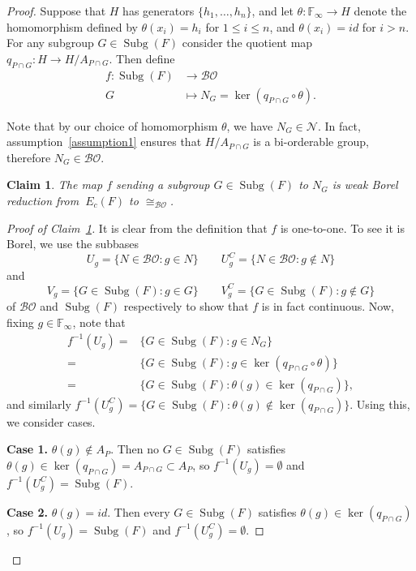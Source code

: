 \documentclass{amsart}
\newtheorem{claim}{Claim}[theorem]
\theoremstyle{definition}
\theoremstyle{remark}
\DeclareMathOperator{\Subg}{Subg}
\begin{document}
\begin{proof}
Suppose that $H$ has generators $\{h_1, \ldots, h_n\}$, and let \(\theta\colon \mathbb{F}_\infty \to H\) denote the homomorphism defined by $\theta(x_i) = h_i$ for $1  \leq i \leq n$, and $\theta(x_i) = id$ for $i > n$. For any subgroup \(G\in \Subg(F)\) consider the quotient map \(q_{P\cap G}\colon H\to H/A_{P\cap G}\). Then define
\begin{align*}
    f\colon \Subg(F) &\to \mathcal{BO}\\
    G & \mapsto N_G=\ker(q_{P\cap G}\circ \theta).
\end{align*}

Note that by our choice of homomorphism $\theta$, we have \(N_G \in \mathcal{N}\). In fact, assumption~\eqref{assumption1} ensures that \(H/A_{P\cap G}\) is a bi-orderable group, therefore \(N_G\in \mathcal{BO}\).

\begin{claim}
\label{claim : wB}
    The map \(f\) sending a subgroup $ G \in \Subg(F)$ to \(N_G\) is weak Borel reduction from \(\
E_c(F)\) to \(\cong_\mathcal{BO}\).
\end{claim}

\begin{proof}[Proof of Claim~\ref{claim : wB}]
    It is clear from the definition that \(f\) is one-to-one.
    To see it is Borel, we use the subbases 
    \[
    U_g=\{N \in \mathcal{BO}:g\in N \}\qquad U^C_g=\{N \in \mathcal{BO}:g\notin N\}
    \]
    and
     \[
    V_g=\{G \in \Subg(F):g\in G \}\qquad V^C_g=\{G \in \Subg(F):g\notin G\}
    \]
    of $\mathcal{BO}$ and $\Subg(F)$ respectively to show that $f$ is in fact continuous.  Now, fixing $g \in \mathbb{F}_\infty$, note that 
     \begin{align*}
        f^{-1}(U_g) =& \{G \in  \Subg(F) : g\in N_G\}\\
        =&\{G \in  \Subg(F) : g\in \ker (q_{P\cap G}\circ \theta)\}\\
        =&\{G \in  \Subg(F) : \theta(g)\in \ker(q_{P\cap G})\},
    \end{align*}
and similarly $f^{-1}(U_g^C) = \{ G \in \Subg(F):\theta(g) \notin \ker(q_{P \cap G})\}$.  Using this, we consider cases.

    \noindent \textbf{Case 1.} $\theta(g) \notin A_P$. Then no $G \in \Subg(F)$ satisfies $\theta(g)\in \ker(q_{P\cap G}) = A_{P \cap G} \subset A_P$, so $f^{-1}(U_g) = \emptyset$ and $f^{-1}(U_g^C) = \Subg(F)$.

\noindent \textbf{Case 2.} $\theta(g) = id$.  Then every $G \in \Subg(F)$ satisfies $\theta(g)\in \ker(q_{P\cap G})$, so $f^{-1}(U_g) = \Subg(F)$ and $f^{-1}(U_g^C) = \emptyset$.


\end{proof}
\end{proof}
\end{document}

